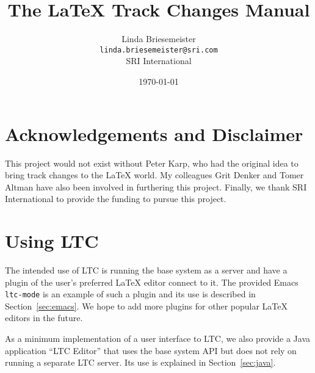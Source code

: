\documentclass[twoside]{report}
\title{The \LaTeX{} Track Changes Manual \version}
\author{%
Linda Briesemeister\\
\texttt{linda.briesemeister@sri.com}\\
SRI International
}
\date{\today}
\begin{document}
\maketitle
{\pagestyle{empty}\cleardoublepage} %

\tableofcontents

\chapter*{Acknowledgements and Disclaimer}

This project would not exist without Peter Karp, who had the original idea to bring track changes to the LaTeX world.  My colleagues Grit Denker and Tomer Altman have also been involved in furthering this project.  Finally, we thank SRI International to provide the funding to pursue this project.






\chapter{Using LTC}

The intended use of LTC is running the base system as a server and have a plugin of the user's preferred LaTeX editor connect to it.  The provided Emacs \texttt{ltc-mode} is an example of such a plugin and its use is described in Section~\ref{sec:emacs}.  We hope to add more plugins for other popular LaTeX editors in the future.

As a minimum implementation of a user interface to LTC, we also provide a Java application ``LTC Editor'' that uses the base system API but does not rely on running a separate LTC server.  Its use is explained in Section~\ref{sec:java}.






%


\end{document}
